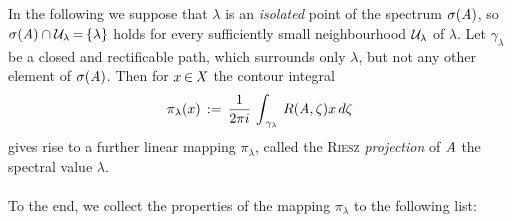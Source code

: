 \documentclass[11pt,twoside]{article}
\begin{document}
\subsection{} %
In the following we suppose that
$\lambda$ is an \textit{isolated} point of the spectrum $\sigma(\mathit{A})$,
so $\sigma(\mathit{A}) \cap \mathcal{U}_{\lambda} {\,=\,} \{\lambda\}$ holds
for every sufficiently small neighbourhood $\mathcal{U}_{\lambda}$ of $\lambda$.
Let $\gamma_{\lambda}$ be a closed and rectificable path,
which surrounds only $\lambda$,
but not any other element of $\sigma(\mathit{A})$.
Then for $x {\,\in\,} \mathit{X}$ the contour integral
\[
\pi_{\lambda}(x) \,:=\,
\frac{1}{2 \pi i} \, \int_{\,\gamma_{\lambda}} \, R(\mathit{A},\zeta) x \, d\zeta
\]
gives rise to a further linear mapping $\pi_{\lambda}$,
called the \textsc{Riesz} \textit{projection} of $\mathit{A}$
{\wrt} the spectral value $\lambda$.

\paragraph{} %
To the end,
we collect the properties of the mapping $\pi_{\lambda}$ to the following list:
\end{document}
